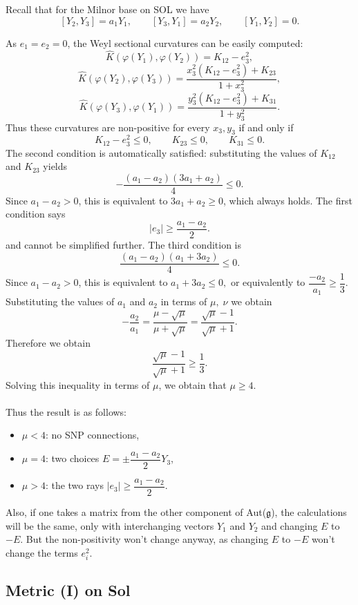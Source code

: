\documentclass[12pt]{article}
\begin{document}
Recall that for the Milnor base  on SOL we have
\[
[Y_2,Y_3]=a_1Y_1,\qquad
[Y_3,Y_1]=a_2Y_2,\qquad
[Y_1,Y_2]=0.
\]

As \(e_1=e_2=0\), the Weyl sectional curvatures can be easily computed:
\[
\widehat K(\varphi(Y_1),\varphi(Y_2))=K_{12}-e_3^2,
\]
\[
\widehat K(\varphi(Y_2),\varphi(Y_3))=\frac{x_3^2(K_{12}-e_3^2)+K_{23}}{1+x_3^2},
\]
\[
\widehat K(\varphi(Y_3),\varphi(Y_1))=\frac{y_3^2(K_{12}-e_3^2)+K_{31}}{1+y_3^2}.
\]
Thus these curvatures are non-positive for every \(x_3,y_3\) if and only if
\[
K_{12}-e_3^2\leq 0,
\qquad
K_{23}\leq 0,
\qquad
K_{31}\leq 0.
\]
The second condition is automatically satisfied: substituting the values of $K_{12}$ and $K_{23}$ yields
\[
-\frac{(a_1-a_2)(3a_1+a_2)}{4}\leq 0.
\]
Since \(a_1-a_2>0\), this is equivalent to $3a_1+a_2\geq 0$,
which always holds. The first condition says
\[
|e_3|\geq \frac{a_1-a_2}{2}.
\]
and cannot be simplified further. The third condition is
\[
\frac{(a_1-a_2)(a_1+3a_2)}{4}\leq 0.
\]
Since \(a_1-a_2>0\), this is equivalent to $a_1+3a_2\leq 0,$ or equivalently to $\dfrac{-a_2}{a_1} \geq \dfrac{1}{3}.$ Substituting the values of $a_1$ and $a_2$ in terms of $\mu,\;\nu$ we obtain
\[
-\frac{a_2}{a_1}
=
\frac{\mu-\sqrt{\mu}}{\mu+\sqrt{\mu}}
=
\frac{\sqrt{\mu}-1}{\sqrt{\mu}+1}.
\]
Therefore we obtain
\[
\frac{\sqrt{\mu}-1}{\sqrt{\mu}+1}\geq \frac13.
\]
Solving this inequality in terms of $\mu$, we obtain that $\mu \geq 4.$ \\~\\
Thus the result is as follows: \begin{itemize}
    \item $\mu < 4$: no SNP connections,
    \item $\mu = 4$: two choices $E = \pm \dfrac{a_1-a_2}{2}Y_3$,
    \item $\mu > 4$: the two rays $|e_3| \geq \dfrac{a_1-a_2}{2}.$
\end{itemize}

Also, if one takes a matrix from the other component of Aut($\mathfrak{g}$), the calculations will be the same, only with interchanging vectors $Y_1$ and $Y_2$ and changing $E$ to $-E$. But the non-positivity won't change anyway, as changing $E$ to $-E$ won't change the terms $e_i^2$.

\subsection*{Metric (I) on Sol}
\end{document}
